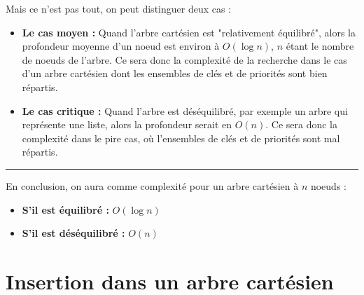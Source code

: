 \documentclass[a4paper,12pt]{report}
\begin{document}
\begin{tcolorbox}[colback=gray!10, colframe=blue!30, coltitle=black, title=Réponse à la 2.b - 2/2]

    Mais ce n'est pas tout, on peut distinguer deux cas :
    \begin{itemize}
        \item \textbf{Le cas moyen :} Quand l'arbre cartésien est "relativement équilibré", alors la profondeur moyenne d'un noeud est environ à \( O(\log n) \), \( n \) étant le nombre de noeuds de l'arbre. Ce sera donc la complexité de la recherche dans le cas d'un arbre cartésien dont les ensembles de clés et de priorités sont bien répartis.
        \item \textbf{Le cas critique :} Quand l'arbre est déséquilibré, par exemple un arbre qui représente une liste, alors la profondeur serait en \( O(n) \). Ce sera donc la complexité dans le pire cas, où l'ensembles de clés et de priorités sont mal répartis.
    \end{itemize}

    \vspace{0.5cm}
    \hrule
    \vspace{0.5cm}

    En conclusion, on aura comme complexité pour un arbre cartésien à \( n \) noeuds :
    \begin{itemize}
        \item \textbf{S'il est équilibré :} \( O(\log n) \)
        \item \textbf{S'il est déséquilibré :} \( O(n) \)
    \end{itemize}

\end{tcolorbox}






\newpage

\renewcommand{\chaptername}{Exercice}
\chapter{Insertion dans un arbre cartésien}



\end{document}

